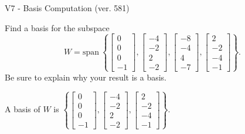 \begin{exercise}
  \begin{exerciseTitle}V7 - Basis Computation (ver. 581)\end{exerciseTitle}
  \begin{exerciseStatement}
    Find a basis for the subspace 
\[W=\mathrm{span}\ \left\{\left[\begin{array}{r}
0 \\
0 \\
0 \\
-1
\end{array}\right] , \left[\begin{array}{r}
-4 \\
-2 \\
2 \\
-2
\end{array}\right] , \left[\begin{array}{r}
-8 \\
-4 \\
4 \\
-7
\end{array}\right] , \left[\begin{array}{r}
2 \\
-2 \\
-4 \\
-1
\end{array}\right]\right\}.\]
 Be sure to explain why your result is a basis.


  \end{exerciseStatement}
  \begin{exerciseAnswer}
   A basis of \(W\) is  \(\left\{\left[\begin{array}{r}
0 \\
0 \\
0 \\
-1
\end{array}\right] , \left[\begin{array}{r}
-4 \\
-2 \\
2 \\
-2
\end{array}\right] , \left[\begin{array}{r}
2 \\
-2 \\
-4 \\
-1
\end{array}\right]\right\}\).
  


  \end{exerciseAnswer}
\end{exercise}